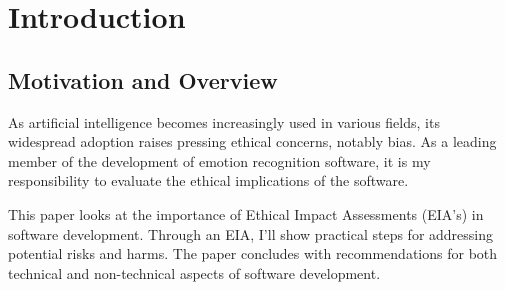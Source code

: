 \documentclass[10pt,journal,compsoc]{IEEEtran}
\begin{document}
\maketitle


\IEEEdisplaynontitleabstractindextext


%
\IEEEpeerreviewmaketitle


\ifCLASSOPTIONcompsoc
{}
\else
\section{Introduction}
\label{sec:introduction}
\fi



\subsection{Motivation and Overview}
As artificial intelligence becomes increasingly used in various fields, its widespread adoption raises pressing ethical concerns, notably bias. As a leading member of the development of emotion recognition software, it is my responsibility to evaluate the ethical implications of the software.

This paper looks at the importance of Ethical Impact Assessments (EIA's) in software development. Through an EIA, I’ll show practical steps for addressing potential risks and harms. The paper concludes with recommendations for both technical and non-technical aspects of software development.
\end{document}
